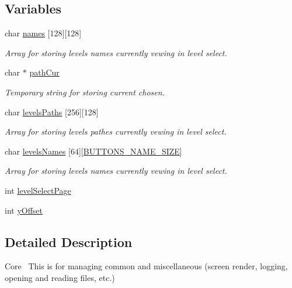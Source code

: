 \subsection*{Variables}
\begin{DoxyCompactItemize}
\item 
char \hyperlink{group___core_ga6341080327d9c3d3ef08fdccd4f05262}{names} \mbox{[}128\mbox{]}\mbox{[}128\mbox{]}
\begin{DoxyCompactList}\small\item\em Array for storing levels names currently vewing in level select. \end{DoxyCompactList}\item 
char $\ast$ \hyperlink{group___core_ga39642f859bbe17ccc6e6d98f84a7cdea}{path\+Cur}
\begin{DoxyCompactList}\small\item\em Temporary string for storing current chosen. \end{DoxyCompactList}\item 
char \hyperlink{group___core_ga5a00f62db43aff74971290ceba5fa7df}{levels\+Paths} \mbox{[}256\mbox{]}\mbox{[}128\mbox{]}
\begin{DoxyCompactList}\small\item\em Array for storing levels pathes currently vewing in level select. \end{DoxyCompactList}\item 
char \hyperlink{group___core_gae5cb82a78ca4ac2c20f9d071e7124f38}{levels\+Names} \mbox{[}64\mbox{]}\mbox{[}\hyperlink{group___button_ga5a86b4b0ec8a21993f74ae423ec74538}{B\+U\+T\+T\+O\+N\+S\+\_\+\+N\+A\+M\+E\+\_\+\+S\+I\+ZE}\mbox{]}
\begin{DoxyCompactList}\small\item\em Array for storing levels names currently vewing in level select. \end{DoxyCompactList}\item 
int \hyperlink{group___core_ga75f52c6778fb4d3418ef0925d17fb164}{level\+Select\+Page}
\item 
int \hyperlink{group___core_ga016718268d32fcb95b1190cc1071e270}{y\+Offset}
\end{DoxyCompactItemize}


\subsection{Detailed Description}
Core~\newline
This is for managing common and miscellaneous (screen render, logging, opening and reading files, etc.) 

